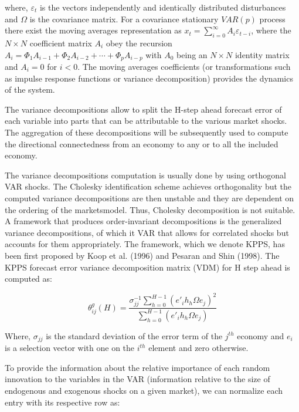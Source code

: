 \documentclass[]{elsarticle} %
\begin{document}
where, \({{\varepsilon }_{t}}\) is the vectors independently and
identically distributed disturbances and \(\Omega\) is the covariance
matrix. For a covariance stationary \(VAR\left( p \right)\) process
there exist the moving averages representation as
\({{x}_{t}}=\sum\nolimits_{i=0}^{\infty }{{{A}_{i}}{{\varepsilon }_{t-i}}}\),
where the \(N\times N\) coefficient matrix \({{A}_{i}}\) obey the
recursion
\({{A}_{i}}={{\Phi }_{1}}{{A}_{i-1}}+{{\Phi }_{2}}{{A}_{i-2}}+\cdots +{{\Phi }_{p}}{{A}_{i-p}}\)
with \({{A}_{0}}\) being an \(N\times N\) identity matrix and
\({{A}_{i}}=0\) for \(i<0\). The moving averages coefficients (or
transformations such as impulse response functions or variance
decomposition) provides the dynamics of the system.

The variance decompositions allow to split the H-step ahead forecast
error of each variable into parts that can be attributable to the
various market shocks. The aggregation of these decompositions will be
subsequently used to compute the directional connectedness from an
economy to any or to all the included economy.

The variance decompositions computation is usually done by using
orthogonal VAR shocks. The Cholesky identification scheme achieves
orthogonality but the computed variance decompositions are then unstable
and they are dependent on the ordering of the marketsmodel. Thus,
Cholesky decomposition is not suitable. A framework that produces
order-invariant decompositions is the generalized variance
decompositions, of which it VAR that allows for correlated shocks but
accounts for them appropriately. The framework, which we denote KPPS,
has been first proposed by Koop et al. (1996) and Pesaran and Shin
(1998). The KPPS forecast error variance decomposition matrix (VDM) for
H step ahead is computed as:

\[\theta _{ij}^{g}\left( H \right)=\frac{\sigma _{jj}^{-1}\sum\nolimits_{h=0}^{H-1}{{{\left( {{{{e}'}}_{i}}{{h}_{h}}\Omega {{e}_{j}} \right)}^{2}}}}{\sum\nolimits_{h=0}^{H-1}{\left( {{{{e}'}}_{i}}{{h}_{h}}\Omega {{e}_{j}} \right)}}\]

Where, \({{\sigma }_{jj}}\) is the standard deviation of the error term
of the \({{j}^{th}}\) economy and \({{e}_{i}}\) is a selection vector
with one on the \({{i}^{th}}\) element and zero otherwise.

To provide the information about the relative importance of each random
innovation to the variables in the VAR (information relative to the size
of endogenous and exogenous shocks on a given market), we can normalize
each entry with its respective row as:
\end{document}
